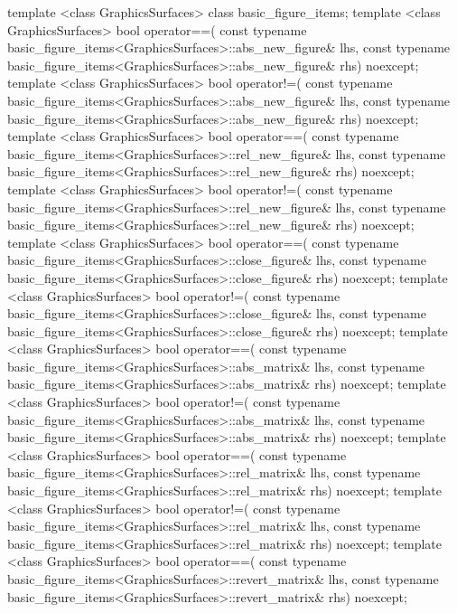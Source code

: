 \begin{codeblock}
{{    template <class GraphicsSurfaces>
    class basic_figure_items;
    template <class GraphicsSurfaces>
    bool operator==(
      const typename basic_figure_items<GraphicsSurfaces>::abs_new_figure& lhs,
      const typename basic_figure_items<GraphicsSurfaces>::abs_new_figure& rhs) 
      noexcept;
    template <class GraphicsSurfaces>
    bool operator!=(
      const typename basic_figure_items<GraphicsSurfaces>::abs_new_figure& lhs,
      const typename basic_figure_items<GraphicsSurfaces>::abs_new_figure& rhs) noexcept;
    template <class GraphicsSurfaces>
    bool operator==(
      const typename basic_figure_items<GraphicsSurfaces>::rel_new_figure& lhs,
      const typename basic_figure_items<GraphicsSurfaces>::rel_new_figure& rhs) 
      noexcept;
    template <class GraphicsSurfaces>
    bool operator!=(
      const typename basic_figure_items<GraphicsSurfaces>::rel_new_figure& lhs,
      const typename basic_figure_items<GraphicsSurfaces>::rel_new_figure& rhs) 
      noexcept;
    template <class GraphicsSurfaces>
    bool operator==(
      const typename basic_figure_items<GraphicsSurfaces>::close_figure& lhs,
      const typename basic_figure_items<GraphicsSurfaces>::close_figure& rhs) 
      noexcept;
    template <class GraphicsSurfaces>
    bool operator!=(
      const typename basic_figure_items<GraphicsSurfaces>::close_figure& lhs,
      const typename basic_figure_items<GraphicsSurfaces>::close_figure& rhs) 
      noexcept;
    template <class GraphicsSurfaces>
    bool operator==(
      const typename basic_figure_items<GraphicsSurfaces>::abs_matrix& lhs,
      const typename basic_figure_items<GraphicsSurfaces>::abs_matrix& rhs) 
      noexcept;
    template <class GraphicsSurfaces>
    bool operator!=(
      const typename basic_figure_items<GraphicsSurfaces>::abs_matrix& lhs,
      const typename basic_figure_items<GraphicsSurfaces>::abs_matrix& rhs) 
      noexcept;
    template <class GraphicsSurfaces>
    bool operator==(
      const typename basic_figure_items<GraphicsSurfaces>::rel_matrix& lhs,
      const typename basic_figure_items<GraphicsSurfaces>::rel_matrix& rhs) 
      noexcept;
    template <class GraphicsSurfaces>
    bool operator!=(
      const typename basic_figure_items<GraphicsSurfaces>::rel_matrix& lhs,
      const typename basic_figure_items<GraphicsSurfaces>::rel_matrix& rhs) 
      noexcept;
    template <class GraphicsSurfaces>
    bool operator==(
      const typename basic_figure_items<GraphicsSurfaces>::revert_matrix& lhs,
      const typename basic_figure_items<GraphicsSurfaces>::revert_matrix& rhs) 
      noexcept;
}}
\end{codeblock}
